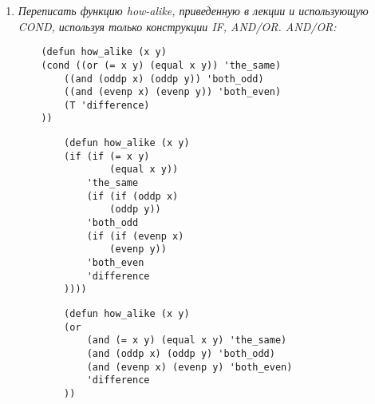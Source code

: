 \begin{enumerate}[wide=0pt]
	\item  \textit{Переписать функцию how-alike, приведенную в лекции и использующую
	COND, используя только конструкции IF, AND/OR.
	AND/OR:}

	\begin{lstlisting}
	(defun how_alike (x y)
    (cond ((or (= x y) (equal x y)) 'the_same)
        ((and (oddp x) (oddp y)) 'both_odd)
        ((and (evenp x) (evenp y)) 'both_even)
        (T 'difference)
	))
	\end{lstlisting}


	\begin{lstlisting}
		(defun how_alike (x y)
		(if (if (= x y)
				(equal x y))
			'the_same
			(if (if (oddp x)
				(oddp y))
			'both_odd
			(if (if (evenp x)
				(evenp y))
			'both_even
			'difference
		))))
	\end{lstlisting}


	\begin{lstlisting}
		(defun how_alike (x y)
		(or
			(and (= x y) (equal x y) 'the_same)
			(and (oddp x) (oddp y) 'both_odd)
			(and (evenp x) (evenp y) 'both_even)
			'difference
		))
	\end{lstlisting}



\end{enumerate}